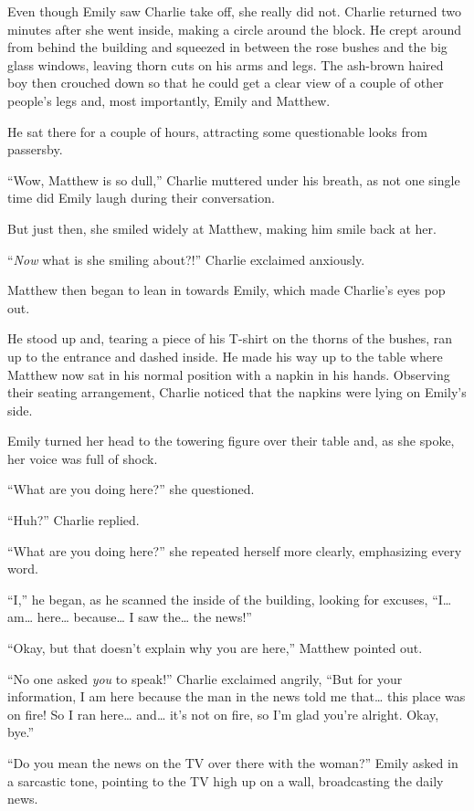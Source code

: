 Even though Emily saw Charlie take off, she really did not. Charlie returned two minutes after she went inside, making a circle around the block. He crept around from behind the building and squeezed in between the rose bushes and the big glass windows, leaving thorn cuts on his arms and legs. The ash-brown haired boy then crouched down so that he could get a clear view of a couple of other people's legs and, most importantly, Emily and Matthew.

He sat there for a couple of hours, attracting some questionable looks from passersby.

“Wow, Matthew is so dull,” Charlie muttered under his breath, as not one single time did Emily laugh during their conversation.

But just then, she smiled widely at Matthew, making him smile back at her.

“\textit{Now} what is she smiling about?!” Charlie exclaimed anxiously.

Matthew then began to lean in towards Emily, which made Charlie's eyes pop out.

He stood up and, tearing a piece of his T-shirt on the thorns of the bushes, ran up to the entrance and dashed inside. He made his way up to the table where Matthew now sat in his normal position with a napkin in his hands. Observing their seating arrangement, Charlie noticed that the napkins were lying on Emily's side.

Emily turned her head to the towering figure over their table and, as she spoke, her voice was full of shock.

“What are you doing here?” she questioned.

“Huh?” Charlie replied.

“What are you doing here?” she repeated herself more clearly, emphasizing every word.

“I,” he began, as he scanned the inside of the building, looking for excuses, “I… am… here… because… I saw the… the news!”

“Okay, but that doesn't explain why you are here,” Matthew pointed out.

“No one asked \textit{you} to speak!” Charlie exclaimed angrily, “But for your information, I am here because the man in the news told me that… this place was on fire! So I ran here… and… it's not on fire, so I'm glad you're alright. Okay, bye.”

“Do you mean the news on the TV over there with the woman?” Emily asked in a sarcastic tone, pointing to the TV high up on a wall, broadcasting the daily news.

